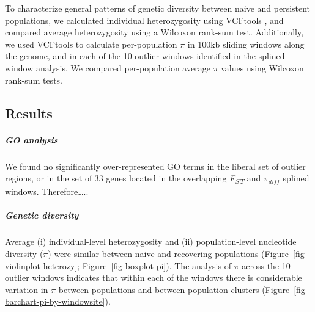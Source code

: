 \documentclass[9pt,twoside,lineno]{pnas-new}
\begin{document}
To characterize general patterns of genetic diversity between naive and
persistent populations, we calculated individual heterozygosity using
VCFtools \citep{danecek2011}, and compared average heterozygosity using
a Wilcoxon rank-sum test. Additionally, we used VCFtools to calculate
per-population \(\pi\) in 100kb sliding windows along the genome, and in
each of the 10 outlier windows identified in the splined window
analysis. We compared per-population average \(\pi\) values using
Wilcoxon rank-sum tests.

\hypertarget{results-1}{%
\subsection{Results}\label{results-1}}

\hypertarget{go-analysis-1}{%
\subparagraph{GO analysis}\label{go-analysis-1}}

We found no significantly over-represented GO terms in the liberal set
of outlier regions, or in the set of 33 genes located in the overlapping
\emph{F\textsubscript{ST}} and \(\pi_{diff}\) splined windows.
Therefore\ldots..

\hypertarget{genetic-diversity-1}{%
\subparagraph{Genetic diversity}\label{genetic-diversity-1}}

Average (i) individual-level heterozygosity and (ii) population-level
nucleotide diversity (\(\pi\)) were similar between naive and recovering
populations (Figure~\ref{fig-violinplot-heterozy};
Figure~\ref{fig-boxplot-pi}). The analysis of \(\pi\) across the 10
outlier windows indicates that within each of the windows there is
considerable variation in \(\pi\) between populations and between
population clusters (Figure~\ref{fig-barchart-pi-by-windowsite}).

\newpage

\newpage
\end{document}
